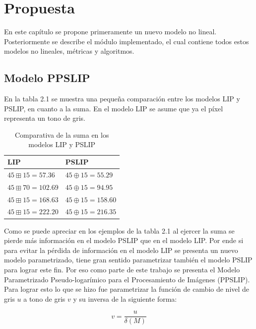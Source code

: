 \chapter{Propuesta}\label{chapter:proposal}

En este cap\'itulo se propone primeramente un nuevo modelo no lineal. Posteriormente se describe el m\'odulo implementado, el cual contiene todos estos modelos no lineales, m\'etricas y algoritmos.

\section{Modelo PPSLIP}

En la tabla 2.1 se muestra una peque\~na comparaci\'on entre los modelos LIP y PSLIP, en cuanto a la suma. En el modelo LIP se asume que ya el p\'ixel representa un tono de gris.

\begin{table}
	\caption{Comparativa de la suma en los modelos LIP y PSLIP}
	\begin{center}
		\begin{tabular}{|l|l|}
			\hline 
			\textbf{LIP} & \textbf{PSLIP}\\
			\hline
			$45 \boxplus 15 = 57.36$ & $45 \oplus 15 = 55.29$\\
			\hline
			$45 \boxplus 70 = 102.69$ & $45 \oplus 15 = 94.95$\\
			\hline
			$45 \boxplus 15 = 168.63$ & $45 \oplus 15 = 158.60$\\
			\hline
			$45 \boxplus 15 = 222.20$ & $45 \oplus 15 = 216.35$\\
			\hline
		\end{tabular}
	\end{center}
\end{table}

Como se puede apreciar en los ejemplos de la tabla 2.1 al ejercer la suma se pierde m\'as informaci\'on en el modelo PSLIP que en el modelo LIP. Por ende si para evitar la p\'erdida de informaci\'on en el modelo LIP se presenta un nuevo modelo parametrizado, tiene gran sentido parametrizar tambi\'en el modelo PSLIP para lograr este fin. Por eso como parte de este trabajo se presenta el Modelo Parametrizado Pseudo-logar\'imico para el Procesamiento de Im\'agenes (PPSLIP). Para lograr esto lo que se hizo fue parametrizar la funci\'on de cambio de nivel de gris $u$ a tono de gris $v$ y su inversa de la siguiente forma:

\begin{equation}
	v=\frac{u}{\delta(M)}
\end{equation}

